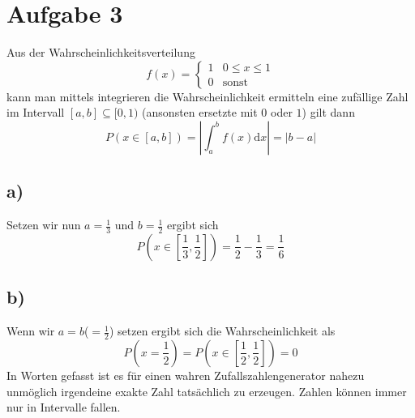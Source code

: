 \section{Aufgabe 3}
\label{sec:Aufgabe3}
Aus der Wahrscheinlichkeitsverteilung
\begin{equation}
  f(x)=
  \begin{cases}
    1   & 0\leq x \leq 1\\
    0   &\text{sonst}
  \end{cases}
\end{equation}
kann man mittels integrieren die Wahrscheinlichkeit ermitteln eine zufällige Zahl
im Intervall $[a,b]\subseteq [0,1)$ (ansonsten ersetzte mit $0$ oder $1$) gilt dann
\begin{equation}
  P(x\in [ a,b ])=\left|\int_a^b f(x)\text{d}x\right|=|b-a|
\end{equation}
\subsection{a)}
Setzen wir nun $a=\frac{1}{3}$ und $b=\frac{1}{2}$ ergibt sich
\begin{equation}
  P\left(x\in \left[\frac{1}{3},\frac{1}{2}\right]\right)=\frac{1}{2}-\frac{1}{3}=\frac{1}{6}
\end{equation}

\subsection{b)}
Wenn wir $a=b$($=\frac{1}{2}$) setzen ergibt sich die Wahrscheinlichkeit als
\begin{equation}
  P\left(x=\frac{1}{2}\right)=P\left(x\in \left[\frac{1}{2},\frac{1}{2}\right]\right)=0
\end{equation}
In Worten gefasst ist es für einen wahren Zufallszahlengenerator nahezu unmöglich irgendeine exakte Zahl tatsächlich zu erzeugen. Zahlen können immer nur in Intervalle fallen.

